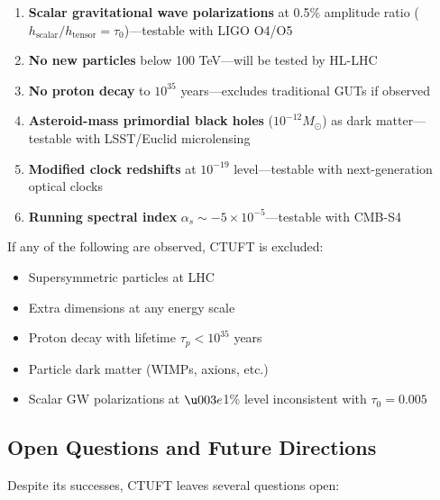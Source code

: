 \begin{enumerate}
    \item \textbf{Scalar gravitational wave polarizations} at 0.5\% amplitude ratio ($h_{\text{scalar}}/h_{\text{tensor}} = \tau_0$)—testable with LIGO O4/O5
    
    \item \textbf{No new particles} below 100 TeV—will be tested by HL-LHC
    
    \item \textbf{No proton decay} to $10^{35}$ years—excludes traditional GUTs if observed
    
    \item \textbf{Asteroid-mass primordial black holes} ($10^{-12} M_\odot$) as dark matter—testable with LSST/Euclid microlensing
    
    \item \textbf{Modified clock redshifts} at $10^{-19}$ level—testable with next-generation optical clocks
    
    \item \textbf{Running spectral index} $\alpha_s \sim -5\times 10^{-5}$—testable with CMB-S4
\end{enumerate}

If any of the following are observed, CTUFT is excluded:
\begin{itemize}
    \item Supersymmetric particles at LHC
    \item Extra dimensions at any energy scale
    \item Proton decay with lifetime $\tau_p < 10^{35}$ years
    \item Particle dark matter (WIMPs, axions, etc.)
    \item Scalar GW polarizations at $\u003e$1\% level inconsistent with $\tau_0 = 0.005$
\end{itemize}

\subsection{Open Questions and Future Directions}

Despite its successes, CTUFT leaves several questions open:


